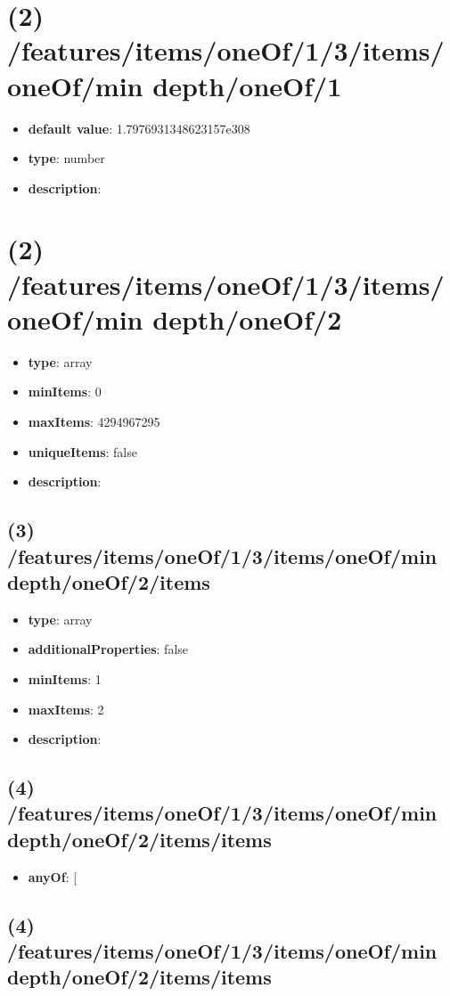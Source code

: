 \section{(2) /features/items/oneOf/1/3/items/oneOf/min depth/oneOf/1}
\begin{itemize}[leftmargin=2em]\item {\bf default value}: 1.7976931348623157e308
\item {\bf type}: number
\item {\bf description}: 
\end{itemize}\section{(2) /features/items/oneOf/1/3/items/oneOf/min depth/oneOf/2}
\begin{itemize}[leftmargin=2em]\item {\bf type}: array
\item {\bf minItems}: 0
\item {\bf maxItems}: 4294967295
\item {\bf uniqueItems}: false
\item {\bf description}: 
\end{itemize}\subsection{(3) /features/items/oneOf/1/3/items/oneOf/min depth/oneOf/2/items}
\begin{itemize}[leftmargin=3em]\item {\bf type}: array
\item {\bf additionalProperties}: false
\item {\bf minItems}: 1
\item {\bf maxItems}: 2
\item {\bf description}: 
\end{itemize}\subsection{(4) /features/items/oneOf/1/3/items/oneOf/min depth/oneOf/2/items/items}
\begin{itemize}[leftmargin=4em]\item {\bf anyOf}: [\end{itemize}\subsection{(4) /features/items/oneOf/1/3/items/oneOf/min depth/oneOf/2/items/items}
